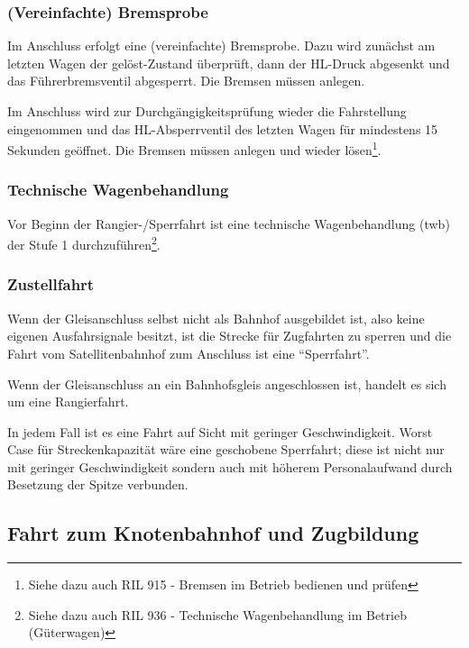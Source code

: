 \subsubsection{(Vereinfachte) Bremsprobe}\label{sec:vBremsprobe}
Im Anschluss erfolgt eine (vereinfachte) \gls{Bremsprobe}. Dazu wird zunächst am letzten Wagen der gelöst-Zustand überprüft, dann der \acrshort{HL}-Druck abgesenkt und das Führerbremsventil abgesperrt. Die Bremsen müssen anlegen.\par
Im Anschluss wird zur Durchgängigkeitsprüfung wieder die Fahrstellung eingenommen und das \acrshort{HL}-Absperrventil des letzten Wagen für mindestens 15 Sekunden geöffnet. Die Bremsen müssen anlegen und wieder lösen\footnote{Siehe dazu auch RIL 915 - Bremsen im Betrieb bedienen und prüfen}.
\subsubsection{Technische Wagenbehandlung}\label{sec:tWb}
Vor Beginn der Rangier-/\gls{Sperrfahrt} ist eine \gls{technische Wagenbehandlung} (\acrshort{twb}) der Stufe 1 %
durchzuführen\footnote{Siehe dazu auch RIL 936 - Technische Wagenbehandlung im Betrieb (Güterwagen)}. 
\subsubsection{Zustellfahrt}\label{sec:Zustellfahrt}
Wenn der Gleisanschluss selbst nicht als Bahnhof ausgebildet ist, also keine eigenen Ausfahrsignale besitzt, ist die Strecke für Zugfahrten zu sperren und die Fahrt  vom Satellitenbahnhof zum Anschluss ist eine  "`\gls{Sperrfahrt}"'.\par
Wenn der \gls{Gleisanschluss} an ein Bahnhofsgleis angeschlossen ist, handelt es sich um eine \gls{Rangierfahrt}.\par
In jedem Fall ist es eine Fahrt auf Sicht mit geringer Geschwindigkeit. Worst Case für Streckenkapazität wäre eine geschobene \gls{Sperrfahrt}; diese ist nicht nur mit geringer Geschwindigkeit sondern auch mit höherem Personalaufwand durch Besetzung der Spitze verbunden.

\subsection{Fahrt zum Knotenbahnhof und Zugbildung}
